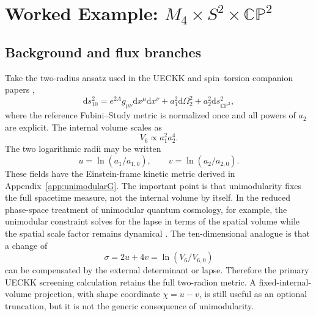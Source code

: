 \documentclass[aps,prd,twocolumn,superscriptaddress,nofootinbib,longbibliography,floatfix]{revtex4-2}
\newcommand{\dd}{\mathrm d}
\newcommand{\CP}{\mathbb{CP}}
\begin{document}
\section{Worked Example: $M_4\times S^2\times\CP^2$}
\label{sec:s2cp2}

\subsection{Background and flux branches}
Take the two-radius ansatz used in the UECKK and spin--torsion companion papers \cite{ShayaUECKK2026,ShayaVacuum2026},
\begin{equation}
\dd s_{10}^2=e^{2A}g_{\mu\nu}\dd x^\mu\dd x^\nu+a_1^2\dd\Omega_2^2+a_2^2\dd s_{\CP^2}^2,
\end{equation}
where the reference Fubini--Study metric is normalized once and all powers of $a_2$ are explicit. The internal volume scales as
\begin{equation}
V_6\propto a_1^2a_2^4.
\end{equation}
The two logarithmic radii may be written
\begin{equation}
u=\ln(a_1/a_{1,0}),\qquad v=\ln(a_2/a_{2,0}).
\end{equation}
These fields have the Einstein-frame kinetic metric derived in Appendix~\ref{app:unimodularG}. The important point is that unimodularity fixes the full spacetime measure, not the internal volume by itself. In the reduced phase-space treatment of unimodular quantum cosmology, for example, the unimodular constraint solves for the lapse in terms of the spatial volume while the spatial scale factor remains dynamical \cite{Yamashita2026UnimodularQC}. The ten-dimensional analogue is that a change of
\begin{equation}
\sigma=2u+4v=\ln(V_6/V_{6,0})
\end{equation}
can be compensated by the external determinant or lapse. Therefore the primary UECKK screening calculation retains the full two-radion metric. A fixed-internal-volume projection, with shape coordinate \(\chi=u-v\), is still useful as an optional truncation, but it is not the generic consequence of unimodularity.
\end{document}
